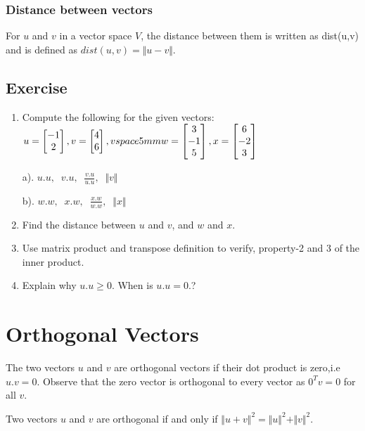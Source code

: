 \documentclass[aima104_lecturenotes_ku.tex]{subfiles}
\begin{document}
\subsubsection{Distance between vectors}
For $u$ and $v$ in a vector space $V$, the distance between them is written as dist(u,v) and is defined as $dist(u,v) = \Vert u-v \Vert$.

\subsection{Exercise}
\begin{enumerate}
\item Compute the following for the given vectors: \\
  $u=
  \begin{bmatrix}
    -1 \\ 2
  \end{bmatrix}, \vspace{4mm}
   v=
   \begin{bmatrix}
     4 \\6
   \end{bmatrix},
   vspace{5mm}
   w=
   \begin{bmatrix}
     3 \\ -1 \\ 5
   \end{bmatrix},\vspace{4mm}
   x=
   \begin{bmatrix}
     6 \\ -2 \\3
   \end{bmatrix}
   $
   \begin{multicols}{2}
     a). $\displaystyle u.u, \;\; v.u, \;\; \frac{v.u}{u.u}, \;\; \Vert v \Vert $
     \columnbreak

     b). $\displaystyle w.w, \;\; x.w, \;\; \frac{x.w}{w.w}, \;\; \Vert x \Vert$
   \end{multicols}
 \item Find the distance between $u$ and $v$, and $w$ and $x$.
 \item Use matrix product and transpose definition to verify, property-2 and 3 of the inner product.
 \item Explain why $u.u \geq 0$. When is $u.u =0$.?
\end{enumerate}

\section{Orthogonal Vectors}
The two vectors $u$ and $v$ are orthogonal vectors if their dot product is zero,i.e $u.v = 0$. Observe that the zero vector is orthogonal to every vector as $0^Tv=0$ for all $v$.
\begin{thm}
  Two vectors $u$ and $v$ are orthogonal if and only if $\Vert u + v \Vert ^2 = \Vert u \Vert ^2 + \Vert v \Vert ^2$.
\end{thm}
\end{document}
